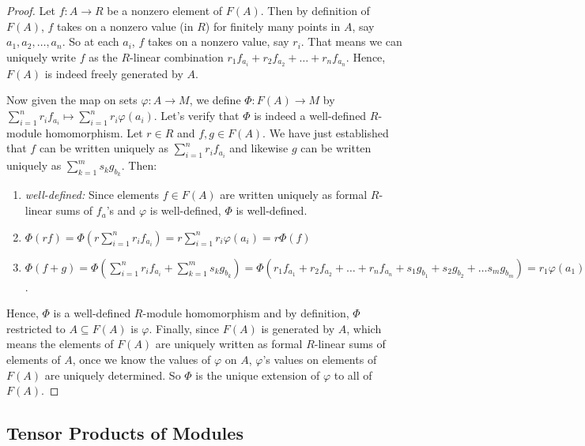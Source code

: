 \documentclass[11pt]{article}
\theoremstyle{definition}
\theoremstyle{plain}
\theoremstyle{plain}
\theoremstyle{plain}
\theoremstyle{definition}
\begin{document}
\begin{proof}
Let $f: A \to R$ be a nonzero element of $F(A)$. Then by definition of $F(A)$, $f$ takes on a nonzero value (in $R$) for finitely many points in $A$, say $a_1, a_2, \dots, a_n$. So at each $a_i$, $f$ takes on a nonzero value, say $r_i$. That means we can uniquely write $f$ as the $R$-linear combination $r_1f_{a_i} + r_2f_{a_2} + \dots + r_nf_{a_n}$. Hence, $F(A)$ is indeed freely generated by $A$.

Now given the map on sets $\varphi: A \to M$, we define $\Phi: F(A) \to M$ by $\sum_{i = 1}^{n}r_if_{a_i} \mapsto \sum_{i=1}^{n}r_i\varphi(a_i)$. Let's verify that $\Phi$ is indeed a well-defined $R$-module homomorphism. Let $r \in R$ and $f, g \in F(A)$. We have just established that $f$ can be written uniquely as $\sum_{i=1}^{n}r_if_{a_i}$ and likewise $g$ can be written uniquely as $\sum_{k=1}^{m}s_kg_{b_k}$. Then:

\begin{enumerate}
\item \emph{well-defined: } Since elements $f \in F(A)$ are written uniquely as formal $R$-linear sums of $f_a$'s and $\varphi$ is well-defined, $\Phi$ is well-defined. 
\item $\Phi(rf) = \Phi(r\sum_{i=1}^{n}r_if_{a_i}) = r\sum_{i=1}^{n}r_i\varphi(a_i) = r\Phi(f)$
\item $\Phi(f + g) = \Phi(\sum_{i=1}^{n}r_if_{a_i} + \sum_{k=1}^{m}s_kg_{b_k}) = \Phi(r_1f_{a_1} + r_2f_{a_2} + \dots + r_nf_{a_n} + s_1g_{b_1} + s_2g_{b_2} + \dots s_mg_{b_m}) = r_1\varphi(a_1) + r_2\varphi(a_2) + \dots + r_n\varphi(a_n) + s_1\varphi(b_1) + s_2\varphi(b_2) + \dots + s_m\varphi(b_m) = \sum_{i=1}^{n}r_i\varphi(a_i) + \sum_{k=1}^{m}s_k\varphi(b_k) = \Phi(f) + \Phi(g)$.
\end{enumerate}

Hence, $\Phi$ is a well-defined $R$-module homomorphism and by definition, $\Phi$ restricted to $A \subseteq F(A)$ is $\varphi$. Finally, since $F(A)$ is generated by $A$, which means the elements of $F(A)$ are uniquely written as formal $R$-linear sums of elements of $A$, once we know the values of $\varphi$ on $A$, $\varphi$'s values on elements of $F(A)$ are uniquely determined. So $\Phi$ is the unique extension of $\varphi$ to all of $F(A)$.
\end{proof}

\subsection*{Tensor Products of Modules}
\end{document}
